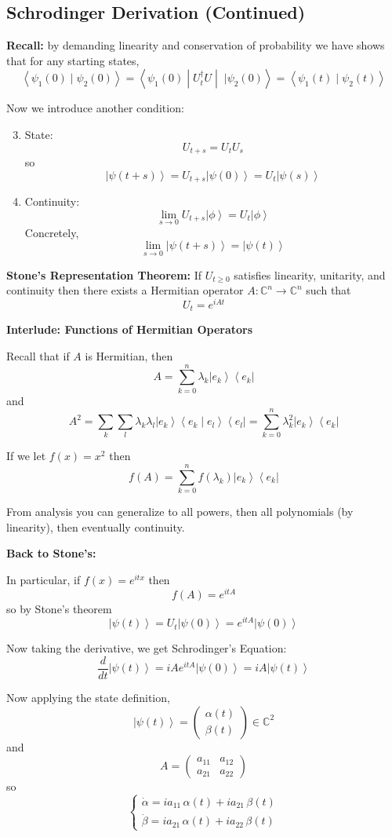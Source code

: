 \documentclass[12pt]{article}
\newcommand{\brak}[1]{\left\langle #1 \right\rangle}
\newcommand{\C}{\mathbb{C}}
\newcommand{\bra}[1]{\left\langle #1 \right\vert }
\newcommand{\ket}[1]{\left\vert #1 \right\rangle}
\begin{document}
\subsection*{Schrodinger Derivation (Continued)}
\textbf{Recall:} by demanding linearity and conservation of probability we have shows that for any starting states,
\[\brak{\psi_1(0) \; | \; \psi_2(0)} = \brak{\psi_1(0) \; | \; U_t^\dagger U \; | \; \; | \psi_2(0)} = \brak{\psi_1(t) \; | \; \psi_2(t)}\]

Now we introduce another condition:
\begin{enumerate}
    \setcounter{enumi}{2}
    \item State: 
    \[U_{t + s} = U_t U_s\]
    so 
    \[\ket{\psi(t + s)} = U_{t + s} \ket{\psi(0)} = U_t \ket{\psi(s)}\]

    \item Continuity: 
    \[\lim_{s \to 0} U_{t+s} \ket \phi = U_t \ket \phi\]
    Concretely,
    \[\lim_{s\to 0} \ket{\psi(t + s)} = \ket{\psi(t)}\]
\end{enumerate}

\textbf{Stone's Representation Theorem:} If $U_{t\geq 0}$ satisfies linearity, unitarity, and continuity then there exists a Hermitian operator $A: \C^n \to \C^n$ such that 
\[U_t = e^{iAt}\]

\textbf{Interlude: Functions of Hermitian Operators}

Recall that if $A$ is Hermitian, then 
\[A = \sum_{k=0}^n \lambda_k \ket{e_k}\bra{e_k}\]
and 
\[A^2 = \sum_{k} \sum_{l} \lambda_k \lambda_l \ket{e_k} \brak{e_k \; | \; e_l}\bra{e_l} = \sum_{k=0}^n \lambda_k^2 \ket{e_k}\bra{e_k}\]

If we let $f(x) = x^2$ then 
\[f(A) = \sum_{k=0}^n f(\lambda_k) \ket{e_k}\bra{e_k}\]

From analysis you can generalize to all powers, then all polynomials (by linearity), then eventually continuity. 

\textbf{Back to Stone's:}

In particular, if $f(x) = e^{itx}$ then 
\[f(A) = e^{itA}\]
so by Stone's theorem
\[\ket{\psi(t)} = U_t\ket{\psi(0)} = e^{itA}\ket{\psi(0)}\]

Now taking the derivative, we get Schrodinger's Equation:
\[\boxed{\frac{d}{dt}\ket{\psi(t)} = iAe^{itA}\ket{\psi(0)} = iA\ket{\psi(t)}}\]

Now applying the state definition,
\[\ket{\psi(t)} = \begin{pmatrix}
    \alpha(t)\\
    \beta(t)
\end{pmatrix} \in \C^2\]
and 
\[A = \begin{pmatrix}
    a_{11} & a_{12}\\
    a_{21} & a_{22}
\end{pmatrix}\]
so 
\[\begin{cases}
    \dot \alpha = ia_{11}\, \alpha(t) + ia_{21}\,\beta(t)\\
    \dot \beta = ia_{21}\, \alpha(t) + ia_{22}\,\beta(t)
\end{cases}\]
\end{document}
